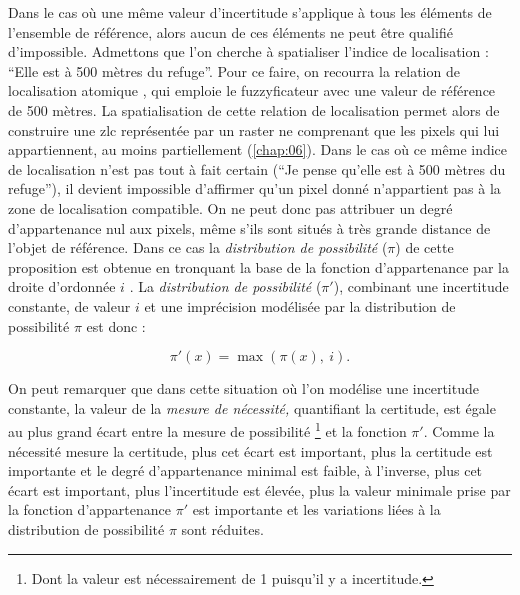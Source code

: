 Dans le cas où une même valeur d'incertitude s'applique à tous les
éléments de l'ensemble de référence, alors aucun de ces éléments ne
peut être qualifié d'impossible.
%
Admettons que l'on cherche à spatialiser l'indice de localisation :
\enquote{Elle est à 500 mètres du refuge}. Pour ce faire, on recourra
la relation de localisation atomique
, qui emploie le fuzzyficateur
 avec une valeur de référence de 500 mètres. La
spatialisation de cette relation de localisation permet alors de
construire une \ac{zlc} représentée par un raster ne comprenant que
les pixels qui lui appartiennent, au moins partiellement
(\autoref{chap:06}). Dans le cas où ce même indice de localisation
n'est pas tout à fait certain (\eg \enquote{Je pense qu'elle est à 500
  mètres du refuge}), il devient impossible d'affirmer qu'un pixel
donné n'appartient pas à la zone de localisation compatible. On ne
peut donc pas attribuer un degré d'appartenance nul aux pixels, même
s'ils sont situés à très grande distance de l'objet de référence. Dans
ce cas la \emph{distribution de possibilité} (\(π\)) de cette
proposition est obtenue en tronquant la base de la fonction
d'appartenance par la droite d'ordonnée \(i\)
\autocite{Bouchon-Meunier2007}. La \emph{distribution de possibilité}
(\(π'\)), combinant une incertitude constante, de valeur \(i\) et une
imprécision modélisée par la distribution de possibilité \(\pi\) est
donc :

\begin{equation}
  \label{eq:incert_imp}
  π'(x) = \max(π(x),\ i).  
\end{equation}

On peut remarquer que dans cette situation où l'on modélise une
incertitude constante, la valeur de la \emph{mesure de nécessité,}
quantifiant la certitude, est égale au plus grand écart entre la
mesure de possibilité \footnote{Dont la valeur est nécessairement de 1
  puisqu’il y a incertitude.} et la fonction \(\pi'\). Comme la
nécessité mesure la certitude, plus cet écart est important, plus la
certitude est importante et le degré d'appartenance minimal est
faible, à l'inverse, plus cet écart est important, plus l'incertitude
est élevée, plus la valeur minimale prise par la fonction
d'appartenance \(\pi'\) est importante et les variations liées à la
distribution de possibilité \(\pi\) sont réduites.

